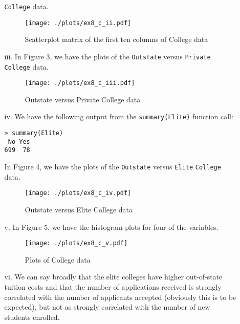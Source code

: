 \begin{itemize}
\begin{itemize}
        \verb|College| data.
        \begin{figure}[!ht]
            \texttt{[image: ./plots/ex8\_c\_ii.pdf]}
            \caption{Scatterplot matrix of the first ten columns of College data}
        \end{figure}
        \item[iii.] In Figure 3, we have the plots of the \verb|Outstate| versus 
        \verb|Private| \verb|College| data.
        \begin{figure}[!ht]
            \texttt{[image: ./plots/ex8\_c\_iii.pdf]}
            \caption{Outstate versus Private College data}
        \end{figure}
        \item[iv.] We have the following output from the \verb|summary(Elite)| function call:
        \begin{verbatim}
> summary(Elite)
 No Yes 
699  78 
        \end{verbatim}
        In Figure 4, we have the plots of the \verb|Outstate| versus 
        \verb|Elite| \verb|College| data.
        \begin{figure}[!ht]
            \texttt{[image: ./plots/ex8\_c\_iv.pdf]}
            \caption{Outstate versus Elite College data}
        \end{figure}
        \item[v.] In Figure 5, we have the histogram plots for four of the variables.
        \begin{figure}[!ht]
            \texttt{[image: ./plots/ex8\_c\_v.pdf]}
            \caption{Plots of College data}
        \end{figure}
        \item[vi.] We can say broadly that the elite colleges have higher out-of-state tuition 
        costs and that the number of applications received is strongly correlated with the
        number of applicants accepted (obviously this is to be expected), but not as strongly
        correlated with the number of new students enrolled.
    \end{itemize}
\end{itemize}
